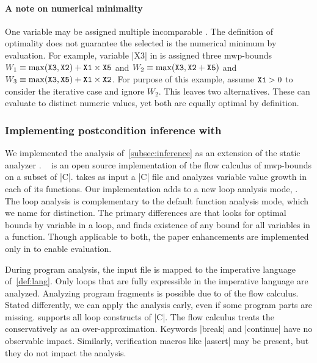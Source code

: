 \paragraph*{A note on numerical minimality}
One variable may be assigned multiple incomparable . The
definition of optimality does not guarantee the
selected  is the numerical minimum by evaluation. For
example, variable \pr|X3| in \exname is assigned three mwp-bounds \(W_1 \equiv
\max(\prm{X3},\prm{X2})+\prm{X1} \times \prm{X5} \) and \(W_2 \equiv
\max(\prm{X3},\prm{X2}+\prm{X5}) \) and \(W_3 \equiv
\max(\prm{X3},\prm{X5})+\prm{X1} \times \prm{X2} \).
For purpose of this example, assume \(\prm{X1}>0\) to consider the iterative
case and ignore \(W_2\). This leaves two alternatives. These can
evaluate to distinct numeric values, yet both are equally optimal by
definition.

\subsubsection{Implementing postcondition inference with \impl}
\label{subsec:implementation}

We implemented the analysis of~\autoref{subsec:inference} as an extension of the
static analyzer . ~\cite{aubert2023b} is an open source
implementation of the flow calculus of mwp-bounds  on a
subset of \pr|C|.  takes as input a \pr|C| file and analyzes
variable value growth in each of its functions. Our implementation adds to
 a new loop analysis mode, \ndx{\impl}. The loop analysis is
complementary to the default function analysis mode, which we name \ndx{\impf}
for distinction. The primary differences are that \ndx{\impl} looks for
{optimal} bounds by variable in a {loop}, and
\ndx{\impf} finds existence of {any} bound for all variables in a {function}.
Though applicable to both, the paper enhancements are implemented only in
\ndx{\impl} to enable evaluation.

During program analysis, the input file is mapped to the imperative language
of~\autoref{def:lang}. Only loops that are fully
expressible in the imperative language are analyzed. Analyzing program fragments
is possible due to  of the flow
calculus. Stated differently, we can apply the analysis
early, even if some program parts are missing.  supports all loop
constructs of \pr|C|. The flow calculus treats the  conservatively as an over-approximation. Keywords \pr|break| and
\pr|continue| have no observable impact. Similarly, verification macros like
\pr|assert| may be present, but they do not impact the
analysis.

